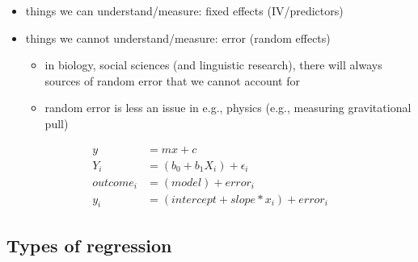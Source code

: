 \documentclass[
  letterpaper,
  DIV=11,
  numbers=noendperiod]{scrartcl}
\providecommand{\tightlist}{%
  \setlength{\itemsep}{0pt}\setlength{\parskip}{0pt}}\usepackage{longtable,booktabs,array}
\begin{document}
\begin{tcolorbox}[enhanced jigsaw, leftrule=.75mm, bottomrule=.15mm, breakable, left=2mm, colback=white, bottomtitle=1mm, colbacktitle=quarto-callout-tip-color!10!white, opacitybacktitle=0.6, titlerule=0mm, colframe=quarto-callout-tip-color-frame, toprule=.15mm, rightrule=.15mm, arc=.35mm, opacityback=0, toptitle=1mm, title=\textcolor{quarto-callout-tip-color}{\faLightbulb}\hspace{0.5em}{Equation of a line}, coltitle=black]

\begin{itemize}
\tightlist
\item
  things we can understand/measure: fixed effects (IV/predictors)
\item
  things we cannot understand/measure: error (random effects)

  \begin{itemize}
  \tightlist
  \item
    in biology, social sciences (and linguistic research), there will
    always sources of random error that we cannot account for
  \item
    random error is less an issue in e.g., physics (e.g., measuring
    gravitational pull)
  \end{itemize}
\end{itemize}

\[
\begin{align}
y & = mx + c\\
Y_i &= (b_0 + b_1X_i) + \epsilon_i\\
outcome_i & = (model) + error_i\\
y_i & = (intercept + slope*x_i) + error_i
\end{align}
\]

\end{tcolorbox}

\hypertarget{types-of-regression}{%
\subsection{Types of regression}\label{types-of-regression}}
\end{document}
